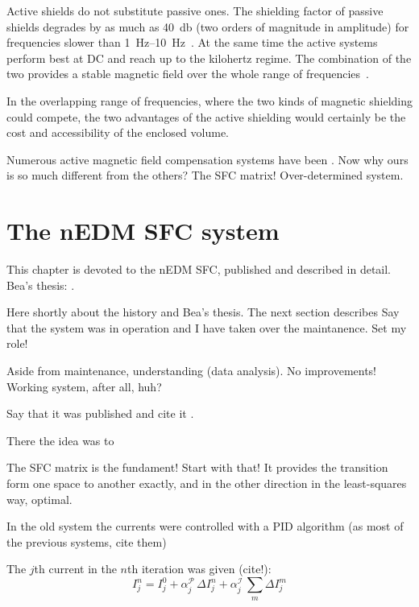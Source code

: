 Active shields do not substitute passive ones. The shielding factor
 of passive shields degrades by as much as \SI{40}{\decibel} (two orders of magnitude in amplitude) for frequencies slower than \SIrange[range-phrase = --]{1}{10}{\hertz}~\cite{Brake1991}. At the same time the active systems perform best at DC and reach up to the kilohertz regime. The combination of the two provides a stable magnetic field over the whole range of frequencies~\cite{Kelha1982,Brake1991,Voigt2013}.

In the overlapping range of frequencies, where the two kinds of magnetic shielding could compete, the two advantages of the active shielding would certainly be the cost and accessibility of the enclosed volume. 

Numerous active magnetic field compensation systems have been \cite{Kelha1982,Brake1991,RetaHernandez1998,Spemann2003,Brys2005,Kobayashi2012,Voigt2013,Afach2014}. Now why ours is so much different from the others? The SFC matrix! Over-determined system.


\section{The nEDM SFC system}
This chapter is devoted to the nEDM SFC, published \cite{Afach2014} and described in detail. Bea's thesis: \cite{Franke2013}.

Here shortly about the history and Bea's thesis. The next section describes Say that the system was in operation and I have taken over the maintanence. Set my role!

Aside from maintenance, understanding (data analysis). No improvements! Working system, after all, huh?

Say that it was published and cite it \cite{Afach2014}.

There the idea was to 

The SFC matrix is the fundament! Start with that! It provides the transition form one space to another exactly, and in the other direction in the least-squares way, optimal.

In the old system the currents were controlled with a PID algorithm (as most of the previous systems, cite them)

The $j$th current in the $n$th iteration was given (cite!):
\begin{equation}
  \label{eq:old_SFC_feedback}
  I^n_j = I^0_j + \alpha^\mathcal{P}_j \, \Delta I^n_j + \alpha^\mathcal{I}_j \, \sum_m \Delta I^m_j
\end{equation}

